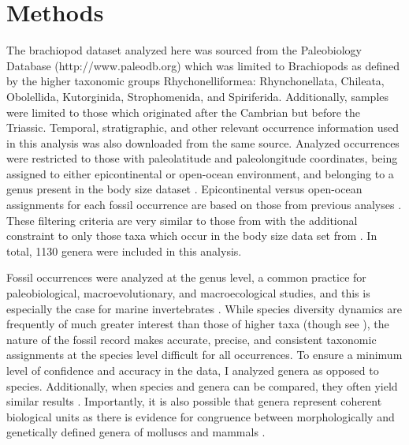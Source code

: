 \documentclass[11pt]{article}
\begin{document}
\section*{Methods}

The brachiopod dataset analyzed here was sourced from the Paleobiology Database (http://www.paleodb.org) which was limited to Brachiopods as defined by the higher taxonomic groups Rhychonelliformea: Rhynchonellata, Chileata, Obolellida, Kutorginida, Strophomenida, and Spiriferida. Additionally, samples were limited to those which originated after the Cambrian but before the Triassic. Temporal, stratigraphic, and other relevant occurrence information used in this analysis was also downloaded from the same source. Analyzed occurrences were restricted to those with paleolatitude and paleolongitude coordinates, being assigned to either epicontinental or open-ocean environment, and belonging to a genus present in the body size dataset \citep{Payne2014}. Epicontinental versus open-ocean assignments for each fossil occurrence are based on those from previous analyses \citep{Miller2009a,Foote2013,Ritterbush2017}. These filtering criteria are very similar to those from \citet{Foote2013} with the additional constraint to only those taxa which occur in the body size data set from \citet{Payne2014}. In total, 1130 genera were included in this analysis.

Fossil occurrences were analyzed at the genus level, a common practice for paleobiological, macroevolutionary, and macroecological studies, and this is especially the case for marine invertebrates \citep{Alroy2010,Foote2013,Harnik2013,Kiessling2007a,Miller2009a,Nurnberg2013a,Nurnberg2015,Payne2007,Ritterbush2017,Simpson2009,Vilhena2013,Eronen2011a}. While species diversity dynamics are frequently of much greater interest than those of higher taxa (though see \citealt{Foote2014b,Hoehn2015}), the nature of the fossil record makes accurate, precise, and consistent taxonomic assignments at the species level difficult for all occurrences. To ensure a minimum level of confidence and accuracy in the data, I analyzed genera as opposed to species. Additionally, when species and genera can be compared, they often yield similar results \citep{Roy1996,Jernvall2002,Foote2007}. Importantly, it is also possible that genera represent coherent biological units as there is evidence for congruence between morphologically and genetically defined genera of molluscs and mammals \citep{Jablonski2009}.
\end{document}
